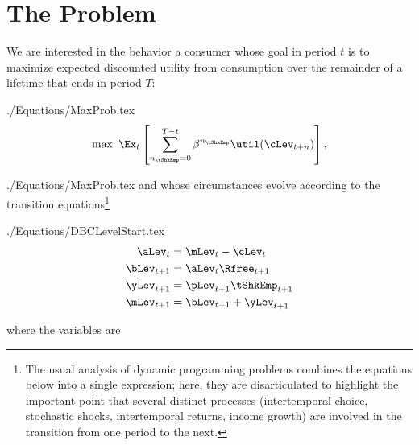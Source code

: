 \documentclass[titlepage]{\econtex}
\begin{document}
\section{The Problem}\label{sec:basicproblem}
We are interested in the behavior a consumer whose goal in period $t$ is to
maximize expected discounted utility from consumption over the remainder of a
lifetime that ends in period $T$:
\begin{verbatimwrite}{./Equations/MaxProb.tex}
  \begin{equation}\label{eq:MaxProb}
    \max ~ \Ex_{t}\left[ \sum_{n_{\tShkEmp}=0}^{T-t} {\DiscAlt}^{n_{\tShkEmp}} \util({\cLev}_{t+n})\right],
  \end{equation}
\end{verbatimwrite}
 {./Equations/MaxProb.tex}
and whose circumstances evolve according to the transition equations\footnote{The usual analysis of dynamic programming problems combines the equations below into a single expression; here, they are disarticulated to highlight the important point that several distinct processes (intertemporal choice, stochastic shocks, intertemporal returns, income growth) are involved in the transition from one period to the next.}
\begin{verbatimwrite}{./Equations/DBCLevelStart.tex}
  \begin{equation}\begin{gathered}\begin{aligned}
    {\aLev}_{t}  & = \mLev_{t}-\cLev_{t} \label{DBCLevelStart}
    \\  {\bLev}_{t+1}  & = {\aLev}_{t} \Rfree_{t+1}
    \\  {\yLev}_{t+1}  & = \pLev_{t+1}\tShkEmp_{t+1}
    \\  {\mLev}_{t+1}  & = {\bLev}_{t+1} + {\yLev}_{t+1} \label{eq:budconstr} \label{DBCLevelEnd}
  \end{aligned}\end{gathered}\end{equation}
\end{verbatimwrite}

where the variables are
\end{document}
